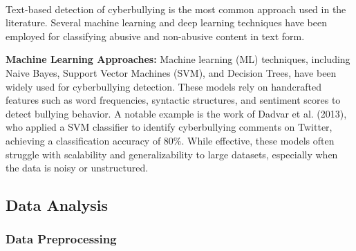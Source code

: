 \documentclass[pdflatex,sn-mathphys-num]{sn-jnl}%
\theoremstyle{thmstyleone}%
\theoremstyle{thmstyletwo}%
\theoremstyle{thmstylethree}%
\begin{document}
\\Text-based detection of cyberbullying is the most common approach used in the literature. Several machine learning and deep learning techniques have been employed for classifying abusive and non-abusive content in text form. 
    \item
    \textbf{Machine Learning Approaches:}
    Machine learning (ML) techniques, including Naive Bayes, Support Vector Machines (SVM), and Decision Trees, have been widely used for cyberbullying detection.\cite{bib3} These models rely on handcrafted features such as word frequencies, syntactic structures, and sentiment scores to detect bullying behavior. A notable example is the work of Dadvar et al. (2013)\cite{bib2}, who applied a SVM classifier to identify cyberbullying comments on Twitter, achieving a classification accuracy of 80\%. While effective, these models often struggle with scalability and generalizability to large datasets, especially when the data is noisy or unstructured.
\subsection{Data Analysis}
\subsubsection{Data Preprocessing}


\end{document}
